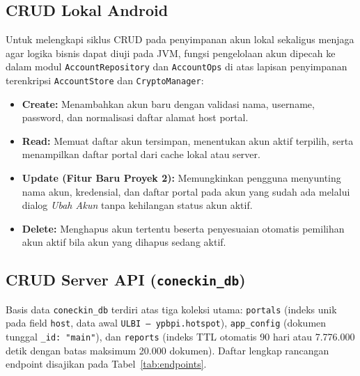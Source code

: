 \subsection{CRUD Lokal Android}
Untuk melengkapi siklus CRUD pada penyimpanan akun lokal sekaligus menjaga agar logika bisnis dapat diuji pada JVM, fungsi pengelolaan akun dipecah ke dalam modul \texttt{AccountRepository} dan \texttt{AccountOps} di atas lapisan penyimpanan terenkripsi \texttt{AccountStore} dan \texttt{CryptoManager}:
\begin{itemize}[leftmargin=*]
  \item \textbf{Create:} Menambahkan akun baru dengan validasi nama, username, password, dan normalisasi daftar alamat host portal.
  \item \textbf{Read:} Memuat daftar akun tersimpan, menentukan akun aktif terpilih, serta menampilkan daftar portal dari cache lokal atau server.
  \item \textbf{Update (Fitur Baru Proyek 2):} Memungkinkan pengguna menyunting nama akun, kredensial, dan daftar portal pada akun yang sudah ada melalui dialog \textit{Ubah Akun} tanpa kehilangan status akun aktif.
  \item \textbf{Delete:} Menghapus akun tertentu beserta penyesuaian otomatis pemilihan akun aktif bila akun yang dihapus sedang aktif.
\end{itemize}

\subsection{CRUD Server API (\texttt{coneckin\_db})}
Basis data \texttt{coneckin\_db} terdiri atas tiga koleksi utama: \texttt{portals} (indeks unik pada field \texttt{host}, data awal \texttt{ULBI — ypbpi.hotspot}), \texttt{app\_config} (dokumen tunggal \texttt{\_id: "main"}), dan \texttt{reports} (indeks TTL otomatis 90 hari atau 7.776.000 detik dengan batas maksimum 20.000 dokumen). Daftar lengkap rancangan endpoint disajikan pada Tabel~\ref{tab:endpoints}.

